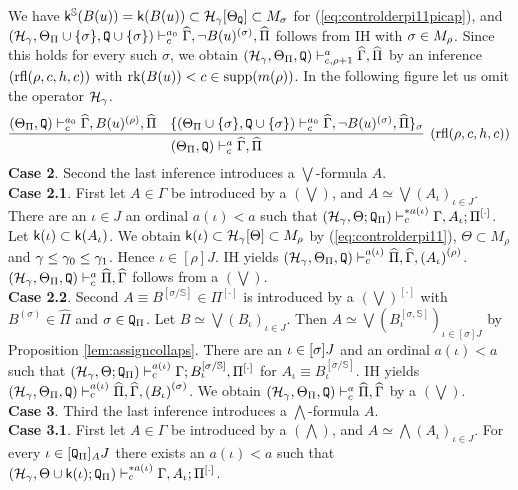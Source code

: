 \documentclass{article}
\newcommand{\mS}{\mathbb{S}}
\begin{document}
We have 
$\sfk^{\mS}(B(u))={\sf k}(B(u))\subset \mathcal{H}_{\gamma}[\Theta_{{\tt Q}}]\subset M_{\sigma}$ for (\ref{eq:controlderpi11picap}),
and
$
(\mathcal{H}_{\gamma},\Theta_{\Pi}\cup\{\sigma\},
{\tt Q}\cup\{\sigma\}
)
\vdash^{a_{0}}_{c}
\widehat{\Gamma},\lnot B(u)^{(\sigma)},\widehat{\Pi}
$ follows from IH with $\sigma\in M_{\rho}$.
Since this holds for every such $\sigma$,
we obtain
$
(\mathcal{H}_{\gamma},\Theta_{\Pi},{\tt Q})
\vdash^{a}_{c,\rho+1}\widehat{\Gamma},\widehat{\Pi}
$
by an inference $({\rm rfl}(\rho,c,h,c))$ with ${\rm rk}(B(u))<c\in {\rm supp}(m(\rho))$.
In the following figure let us omit the operator ${\cal H}_{\gamma}$.
{\small
\[
\infer[({\rm rfl}(\rho,c,h,c))]{(\Theta_{\Pi},{\tt Q})\vdash^{a}_{c}
\widehat{\Gamma},\widehat{\Pi}}
{
(\Theta_{\Pi},{\tt Q}
)\vdash^{a_{0}}_{c}
\widehat{\Gamma},B(u)^{(\rho)},\widehat{\Pi}
 &
\{
(\Theta_{\Pi}\cup\{\sig\},
{\tt Q}\cup\{\sigma\}
)\vdash^{a_{0}}_{c}
\widehat{\Gamma},\lnot B(u)^{(\sigma)},\widehat{\Pi}
\}_{\sig}
}
\]
}
\noindent
\textbf{Case 2}.  
Second the last inference introduces
a $\bigvee$-formula $A$.
\\
\textbf{Case 2.1}.
First let $A\in\Gamma$ be introduced by a $(\bigvee)$,
and $A\simeq\bigvee\left(A_{\iota}\right)_{\iota\in J}$.
There are an $\iota\in J$ an ordinal
 $a(\iota)<a$
such that
$(\mathcal{H}_{\gamma},\Theta;{\tt Q}_{\Pi})\vdash^{* a(\iota)}_{c}
\Gamma,A_{\iota};\Pi^{[\cdot]}$.
Let ${\sf k}(\iota)\subset{\sf k}(A_{\iota})$.
We obtain 
${\sf k}(\iota)\subset\mathcal{H}_{\gamma}[\Theta]\subset 
M_{\rho}$ by (\ref{eq:controlderpi11}), $\Theta\subset M_{\rho}$ and
$\gamma\leq\gamma_{0}\leq\gamma_{1}$.
Hence $\iota\in[\rho]J$.
IH yields $(\mathcal{H}_{\gamma},\Theta_{\Pi},{\tt Q})
\vdash^{a(\iota)}_{c}
\widehat{\Pi},\widehat{\Gamma},
\left(A_{\iota} \right)^{(\rho)}$.
$(\mathcal{H}_{\gamma},\Theta_{\Pi},{\tt Q})
\vdash^{a}_{c}
\widehat{\Pi},\widehat{\Gamma}$ 
follows from a $(\bigvee)$.
\\
\textbf{Case 2.2}.
Second 
$A\equiv B^{[\sigma/\mathbb{S}]}\in\Pi^{[\cdot]}$ is introduced by a $(\bigvee)^{[\cdot]}$
with $B^{(\sigma)}\in\widehat{\Pi}$ and $\sigma\in {\tt Q}_{\Pi}$.
Let $B\simeq\bigvee\left(B_{\iota}\right)_{\iota\in J}$.
Then $A\simeq\bigvee\left(B_{\iota}^{[\sigma,\mathbb{S}]}\right)_{\iota\in [\sigma]J}$ by
Proposition \ref{lem:assigncollaps}.
There are an $\iota\in [\sigma]J$ and an ordinal
 $a(\iota)<a$ 
such that
$(\mathcal{H}_{\gamma},\Theta;{\tt Q}_{\Pi})\vdash^{a(\iota)}_{c}\Gamma;
B_{\iota}^{[\sig/\mS]},\Pi^{[\cdot]}$ for $A_{\iota}\equiv B_{\iota}^{[\sigma/\mathbb{S}]}$.
IH yields $(\mathcal{H}_{\gamma},\Theta_{\Pi},{\tt Q})
\vdash^{a(\iota)}_{c}
\widehat{\Pi},\widehat{\Gamma},\left(B_{\iota}\right)^{(\sigma)}$.
We obtain
$(\mathcal{H}_{\gamma},\Theta_{\Pi},{\tt Q})
\vdash^{a}_{c}
\widehat{\Pi},\widehat{\Gamma}$ 
by a $(\bigvee)$.
\\
\textbf{Case 3}.
Third the last inference introduces a $\bigwedge$-formula $A$.
\\
\textbf{Case 3.1}.
First let $A\in\Gamma$ be introduced by a $(\bigwedge)$, and
$A\simeq\bigwedge\left(A_{\iota}\right)_{\iota\in J}$.
For every
$\iota\in [{\tt Q}_{\Pi}]_{A} J$ there exists an $a(\iota)<a$ 
such that
$(\mathcal{H}_{\gamma},\Theta\cup{\sf k}(\iota);{\tt Q}_{\Pi}
)
\vdash^{* a(\iota)}_{c}\Gamma, A_{\iota};\Pi^{[\cdot]}$.
\end{document}
